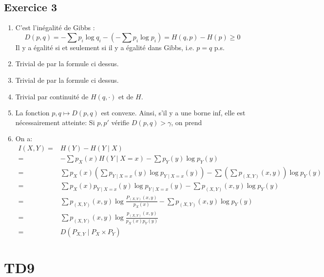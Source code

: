 \documentclass{cours}
\begin{document}
\subsection{Exercice 3}
\begin{enumerate}
	\item C'est l'inégalité de Gibbs : 
		\begin{equation*}
			D(p, q) =  -\sum p_{i}\log q_{i}  - \left(-\sum p_{i}\log p_{i}\right) = H(q, p) - H(p) \geq 0
		\end{equation*}
		Il y a égalité si et seulement si il y a égalité dans Gibbs, i.e. $p = q$ p.s.
	\item Trivial de par la formule ci dessus.
	\item Trivial de par la formule ci dessus.
	\item Trivial par continuité de $H(q, \cdot)$ et de $H$.
	\item La fonction $p, q \mapsto D(p, q)$ est convexe. Ainsi, s'il y a une borne inf, elle est nécessairement atteinte: Si $p, p'$ vérifie $D(p, q) > \gamma$, on prend  
	\item On a: 
		\begin{equation*}
			\begin{aligned}
				I(X, Y) =& H(Y) - H(Y \mid X)\\
				=& -\sum p_{X}(x)H(Y \mid X = x) - \sum p_{Y}(y)\log p_{Y}(y)\\
				=& \sum p_{X}(x) \left( \sum p_{Y \mid X = x}(y) \log p_{Y \mid X = x}(y) \right) - \sum \left(\sum p_{(X, Y)}(x, y)\right)\log p_{Y}(y)\\
				=& \sum p_{X}(x)p_{Y\mid X = x}(y) \log p_{Y\mid X = x}(y) - \sum p_{(X, Y)}(x, y) \log p_{Y}(y)\\
				=& \sum p_{(X, Y)}(x, y)\log \frac{P_{(X, Y)}(x, y)}{p_{X}(x)} - \sum p_{(X, Y)}(x, y)\log p_{Y}(y)\\
				=& \sum p_{(X, Y)}(x, y)\log \frac{p_{(X, Y)}(x, y)}{p_{X}(x)p_{Y}(y)}\\
				=& D(P_{X, Y}\mid P_{X}\times P_{Y})
			\end{aligned}
		\end{equation*}


\end{enumerate}


\section{TD9}
\end{document}
